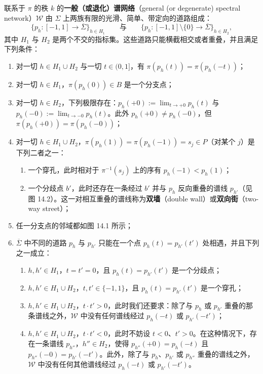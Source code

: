 \begin{definition}[14.1]
联系于 $\pi$ 的秩 $k$ 的\textbf{一般（或退化）谱网络}（general (or degenerate) spectral network）$\mathcal{W}$ 由 $\Sigma$ 上两族有限的光滑、简单、带定向的道路组成：
\[
\{p_h\colon[-1,1]\to\overline{\Sigma}\}_{h\in H_1}
\qquad\text{与}\qquad
\{p_h\colon[-1,1]\setminus\{0\}\to\overline{\Sigma}\}_{h\in H_2} ,
\]
其中 $H_1$ 与 $H_2$ 是两个不交的指标集。这些道路只能横截相交或者重叠，并且满足下列条件：
\begin{enumerate}[label=\arabic*.]
\item 对一切 $h\in H_1\cup H_2$ 与一切 $t\in(0,1]$，有 $\pi(p_h(t))=\pi(p_h(-t))$；
\item 对一切 $h\in H_1$，$\pi(p_h(0))\in B$ 是一个分支点；
\item 对一切 $h\in H_2$，下列极限存在：$p_h(+0):=\lim_{t\to+0}p_h(t)$ 与 $p_h(-0):=\lim_{t\to-0}p_h(t)$。此外 $p_h(+0)\neq p_h(-0)$，但 $\pi(p_h(+0))=\pi(p_h(-0))$；
\item 对一切 $h\in H_1\cup H_2$，$\pi(p_h(1))=\pi(p_h(-1))=s_j\in P$（对某个 $j$）是下列二者之一：
\begin{enumerate}[label=\alph*.]
\item 一个穿孔，此时相对于 $\pi^{-1}(s_j)$ 上的序有 $p_h(-1)<p_h(1)$；
\item 一个分歧点 $b'$，此时还存在一条经过 $b'$ 并与 $p_h$ 反向重叠的谱线 $p_{h'}$（见图 14.2）。这一对相互重叠的谱线称为\textbf{双墙}（double wall）或\textbf{双向街}（two-way street）；
\end{enumerate}
\item 任一分支点的邻域都如图 14.1 所示；
\item $\overline{\Sigma}$ 中不同的道路 $p_h$ 与 $p_{h'}$ 只能在一个点 $p_h(t)=p_{h'}(t')$ 处相遇，并且下列之一成立：
\begin{enumerate}[label=\alph*.]
\item $h,h'\in H_1$，$t=t'=0$，且 $p_h(t)=p_{h'}(t')$ 是一个分歧点；
\item $h,h'\in H_1\cup H_2$，$t,t'\in\{-1,1\}$，且 $p_h(t)=p_{h'}(t')$ 是一个穿孔；
\item $h,h'\in H_1\cup H_2$，$t\cdot t'>0$，此时我们还要求：除了与 $p_h$ 或 $p_{h'}$ 重叠的那条谱线之外，$\mathcal{W}$ 中没有任何谱线经过 $p_h(-t)$ 或 $p_{h'}(-t')$；
\item $h,h'\in H_1\cup H_2$，$t\cdot t'<0$，此时不妨设 $t<0$、$t'>0$。在这种情况下，存在一条谱线 $p_{h''}$，$h''\in H_2$，使得 $p_{h''}(+0)=p_h(-t)$ 且 $p_{h''}(-0)=p_{h'}(-t')$。此外，除了与 $p_h$、$p_{h'}$ 或 $p_{h''}$ 重叠的谱线之外，$\mathcal{W}$ 中没有任何其他谱线经过 $p_h(-t)$ 或 $p_{h'}(-t')$。
\end{enumerate}
\end{enumerate}
\end{definition}

